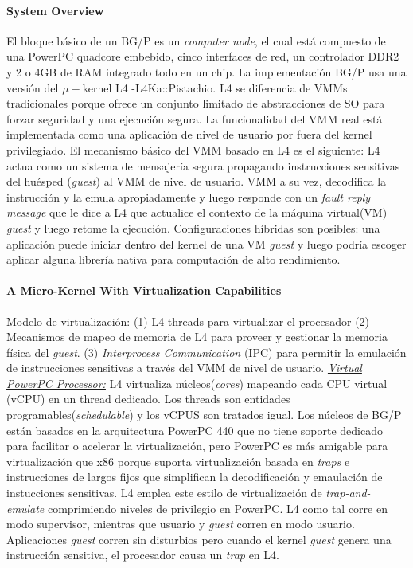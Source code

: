 \paragraph{\textnormal{\textbf{System Overview}}}
El bloque básico de un BG/P es un \emph{computer node}, el cual está compuesto de una PowerPC quadcore embebido, cinco interfaces de red, un controlador DDR2 y 2 o 4GB de RAM integrado todo en un chip. La implementación BG/P usa una versión del $\mu-$kernel L4 -L4Ka::Pistachio. L4 se diferencia de VMMs tradicionales porque ofrece un conjunto limitado de abstracciones de SO para forzar seguridad y una ejecución segura. La funcionalidad del VMM real está implementada como una aplicación de nivel de usuario por fuera del kernel privilegiado. El mecanismo básico del VMM basado en L4 es el siguiente: L4 actua como un sistema de mensajería segura propagando instrucciones sensitivas del huésped (\emph{guest}) al VMM de nivel de usuario. VMM a su vez, decodifica la instrucción y la emula apropiadamente y luego responde con un \emph{fault reply message} que le dice a L4 que actualice el contexto de la máquina virtual(VM) \emph{guest} y luego retome la ejecución. Configuraciones híbridas son posibles: una aplicación puede iniciar dentro del kernel de una VM \emph{guest} y luego podría escoger aplicar alguna librería nativa para computación de alto rendimiento.

\paragraph{\textnormal{\textbf{A Micro-Kernel With Virtualization Capabilities}}}
Modelo de virtualización: (1) L4 threads para virtualizar el procesador (2) Mecanismos de mapeo de memoria de L4 para proveer y gestionar la memoria física del \emph{guest}. (3) \emph{Interprocess Communication} (IPC) para permitir la emulación de instrucciones sensitivas a través del VMM de nivel de usuario. \underline{\emph{Virtual PowerPC Processor:}} L4 virtualiza núcleos(\emph{cores}) mapeando cada CPU virtual (vCPU) en un thread dedicado. Los threads son entidades programables(\emph{schedulable}) y los vCPUS son tratados igual. Los núcleos de BG/P están basados en la arquitectura PowerPC 440 que no tiene soporte dedicado para facilitar o acelerar la virtualización, pero PowerPC es más amigable para virtualización que x86 porque suporta virtualización basada en \emph{traps} e instrucciones de largos fijos que simplifican la decodificación y emaulación de instucciones sensitivas. L4 emplea este estilo de virtualización de \emph{trap-and-emulate} comprimiendo niveles de privilegio en PowerPC. L4 como tal corre en modo supervisor, mientras que usuario y \emph{guest} corren en modo usuario. Aplicaciones \emph{guest} corren sin disturbios pero cuando el kernel \emph{guest} genera una instrucción sensitiva, el procesador causa un \emph{trap} en L4. 

